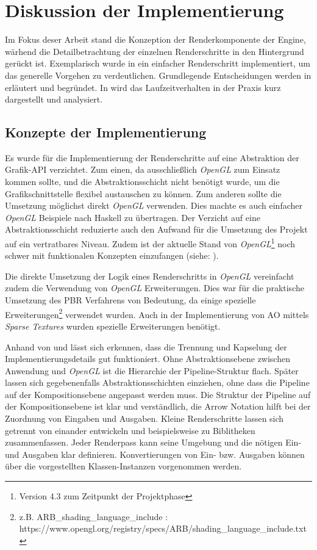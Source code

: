 \section{Diskussion der Implementierung}\label{sec:diskussion-impl}

Im Fokus deser Arbeit stand die Konzeption der Renderkomponente der Engine, wärhend die Detailbetrachtung der einzelnen Renderschritte in den Hintergrund gerückt ist. Exemplarisch wurde in  ein einfacher Renderschritt implementiert, um das generelle Vorgehen zu verdeutlichen. Grundlegende Entscheidungen werden in  erläutert und begründet. In  wird das Laufzeitverhalten in der Praxis kurz dargestellt und analysiert.

\subsection{Konzepte der Implementierung}\label{sec:konzepte-impl}

Es wurde für die Implementierung der Renderschritte auf eine Abstraktion der Grafik-\ac{API} verzichtet. Zum einen, da ausschließlich \textit{OpenGL} zum Einsatz kommen sollte, und die Abstraktionsschicht nicht benötigt wurde, um die Grafikschnittstelle flexibel austauschen zu können. Zum anderen sollte die Umsetzung möglichst direkt \textit{OpenGL} verwenden. Dies machte es auch einfacher \textit{OpenGL} Beispiele nach Haskell zu übertragen. Der Verzicht auf eine Abstraktionsschicht reduzierte auch den Aufwand für die Umsetzung des Projekt auf ein vertratbares Niveau. Zudem ist der aktuelle Stand von \textit{OpenGL}\footnote{Version 4.3 zum Zeitpunkt der Projektphase} noch schwer mit funktionalen Konzepten einzufangen (siehe: ).

Die direkte Umsetzung der Logik eines Renderschritts in \textit{OpenGL} vereinfacht zudem die Verwendung von \textit{OpenGL} Erweiterungen. Dies war für die praktische Umsetzung des \ac{PBR} Verfahrens von Bedeutung, da einige spezielle Erweiterungen\footnote{z.B. ARB\_shading\_language\_include : https://www.opengl.org/registry/specs/ARB/shading\_language\_include.txt} verwendet wurden. Auch in der Implementierung von \acf{AO} mittels \textit{Sparse Textures} wurden spezielle Erweiterungen benötigt.

Anhand von  und  lässt sich erkennen, dass die Trennung und Kapselung der Implementierungsdetails gut funktioniert. Ohne Abstraktionsebene zwischen Anwendung und \textit{OpenGL} ist die Hierarchie der Pipeline-Struktur flach. Später lassen sich gegebenenfalls Abstraktionsschichten einziehen, ohne dass die Pipeline auf der Kompositionsebene angepasst werden muss. Die Struktur der Pipeline auf der Kompositionsebene ist klar und verständlich, die Arrow Notation hilft bei der Zuordnung von Eingaben und Ausgaben. Kleine Renderschritte lassen sich getrennt von einander entwickeln und beispielsweise zu Biblitheken zusammenfassen. Jeder Renderpass kann seine Umgebung und die nötigen Ein- und Ausgaben klar definieren. Konvertierungen von Ein- bzw. Ausgaben können über die vorgestellten Klassen-Instanzen vorgenommen werden.

